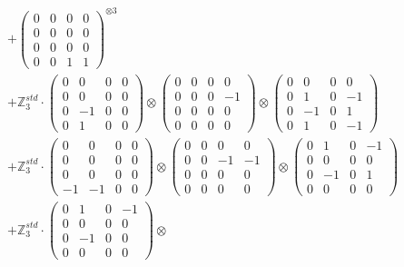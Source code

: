 \documentclass{article}
\begin{document}
{\begin{align}
        &+ \label{Rs16-Rc11-Solution-11-c16} \begin{pmatrix} 0 & 0 & 0 & 0 \\ 0 & 0 & 0 & 0 \\ 0 & 0 & 0 & 0 \\ 0 & 0 & 1 & 1 \end{pmatrix}^{\otimes 3} \\
        &+ \label{Rs16-Rc11-Solution-11-c17} \mathbb{Z}_3^{std} \cdot 
            \begin{pmatrix} 0 & 0 & 0 & 0 \\ 0 & 0 & 0 & 0 \\ 0 & -1 & 0 & 0 \\ 0 & 1 & 0 & 0 \end{pmatrix} \otimes 
            \begin{pmatrix} 0 & 0 & 0 & 0 \\ 0 & 0 & 0 & -1 \\ 0 & 0 & 0 & 0 \\ 0 & 0 & 0 & 0 \end{pmatrix} \otimes 
            \begin{pmatrix} 0 & 0 & 0 & 0 \\ 0 & 1 & 0 & -1 \\ 0 & -1 & 0 & 1 \\ 0 & 1 & 0 & -1 \end{pmatrix} \\ 
        &+ \label{Rs16-Rc11-Solution-11-c18} \mathbb{Z}_3^{std} \cdot 
            \begin{pmatrix} 0 & 0 & 0 & 0 \\ 0 & 0 & 0 & 0 \\ 0 & 0 & 0 & 0 \\ -1 & -1 & 0 & 0 \end{pmatrix} \otimes 
            \begin{pmatrix} 0 & 0 & 0 & 0 \\ 0 & 0 & -1 & -1 \\ 0 & 0 & 0 & 0 \\ 0 & 0 & 0 & 0 \end{pmatrix} \otimes 
            \begin{pmatrix} 0 & 1 & 0 & -1 \\ 0 & 0 & 0 & 0 \\ 0 & -1 & 0 & 1 \\ 0 & 0 & 0 & 0 \end{pmatrix} \\ 
        &+ \label{Rs16-Rc11-Solution-11-c19} \mathbb{Z}_3^{std} \cdot 
            \begin{pmatrix} 0 & 1 & 0 & -1 \\ 0 & 0 & 0 & 0 \\ 0 & -1 & 0 & 0 \\ 0 & 0 & 0 & 0 \end{pmatrix} \otimes 

\end{align}}
\end{document}
